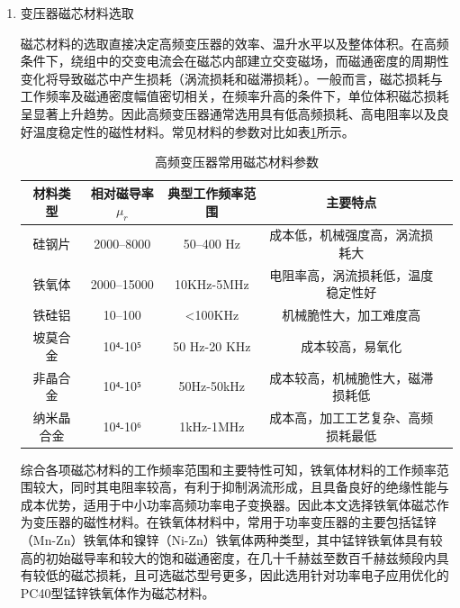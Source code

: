 \begin{enumerate}[topsep = 0 pt, itemsep= 0 pt, parsep=0pt, partopsep=0pt, leftmargin=0pt, itemindent=44pt, labelsep=6pt, listparindent=24pt, label=(\arabic*)]
	\item 变压器磁芯材料选取

	      磁芯材料的选取直接决定高频变压器的效率、温升水平以及整体体积。在高频条件下，绕组中的交变电流会在磁芯内部建立交变磁场，而磁通密度的周期性变化将导致磁芯中产生损耗（涡流损耗和磁滞损耗）。一般而言，磁芯损耗与工作频率及磁通密度幅值密切相关，在频率升高的条件下，单位体积磁芯损耗呈显著上升趋势。因此高频变压器通常选用具有低高频损耗、高电阻率以及良好温度稳定性的磁性材料。常见材料的参数对比如表\ref{magnetic_core}所示。
	      \begin{table}[htbp]
		      \caption{\label{magnetic_core}高频变压器常用磁芯材料参数}
		      \centering
		      \small
		      \setlength{\tabcolsep}{7pt}
		      \begin{tabular}{c c c c c}
			      \hline
			      材料类型  & 相对磁导率$\mu_r$ & 典型工作频率范围     & 主要特点              \\
			      \hline
			      硅钢片   & 2000–8000    & 50–400 Hz    & 成本低，机械强度高，涡流损耗大   \\
			      铁氧体   & 2000–15000   & 10KHz-5MHz   & 电阻率高，涡流损耗低，温度稳定性好 \\
			      铁硅铝   & 10–100       & <100KHz      & 机械脆性大，加工难度高       \\
			      坡莫合金  & 10⁴-10⁵      & 50 Hz-20 KHz & 成本较高，易氧化          \\
			      非晶合金  & 10⁴-10⁵      & 50Hz-50kHz   & 成本较高，机械脆性大，磁滞损耗低  \\
			      纳米晶合金 & 10⁴-10⁶      & 1kHz-1MHz    & 成本高，加工工艺复杂、高频损耗最低 \\
			      \hline
		      \end{tabular}
	      \end{table}

	      综合各项磁芯材料的工作频率范围和主要特性可知，铁氧体材料的工作频率范围较大，同时其电阻率较高，有利于抑制涡流形成，且具备良好的绝缘性能与成本优势，适用于中小功率高频功率电子变换器。因此本文选择铁氧体磁芯作为变压器的磁性材料。在铁氧体材料中，常用于功率变压器的主要包括锰锌（Mn-Zn）铁氧体和镍锌（Ni-Zn）铁氧体两种类型，其中锰锌铁氧体具有较高的初始磁导率和较大的饱和磁通密度，在几十千赫兹至数百千赫兹频段内具有较低的磁芯损耗，且可选磁芯型号更多，因此选用针对功率电子应用优化的PC40型锰锌铁氧体作为磁芯材料。


\end{enumerate}
